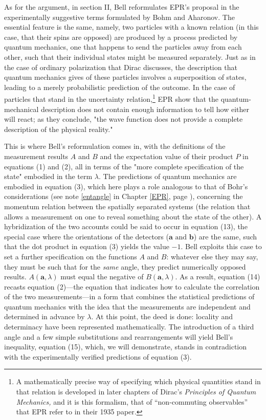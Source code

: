As for the argument, in section II, Bell reformulates EPR's proposal in the experimentally suggestive terms formulated by Bohm and Aharonov. The essential feature is the same, namely, two
particles with a known relation (in this case, that their spins are opposed) are produced 
by a process predicted by quantum mechanics, one that happens to send the particles away from 
each other, such that their individual states might be measured separately. Just as in the case
of ordinary polarization that Dirac discusses, the description that quantum mechanics gives of these particles involves a superposition of states, leading to a merely probabilistic prediction of the outcome. In the case of particles that stand in the uncertainty relation,\footnote{A mathematically precise way of specifying which physical quantities stand in that relation is developed in later chapters of Dirac's \emph{Principles of Quantum Mechanics,} and it is this formalism, that of ``non-commuting observables'' that EPR refer to in their 1935 paper.} EPR show that the quantum-mechanical description does not contain enough information to tell how either will react; as they conclude, "the wave function does not provide a complete description of the physical reality."

This is where Bell's reformulation comes in, with the definitions of the measurement results $A$ and
$B$ and the expectation value of their product $P$ in equations (1) and (2), all in terms of the "more complete specification of the state" embodied in the term $\lambda$. The predictions of quantum
mechanics are embodied in equation (3), which here plays a role analogous to that of Bohr's 
considerations (see note \ref{entangle} in Chapter \ref{EPR}, page \pageref{entangle}), concerning the momentum relation between the spatially 
separated systems (the relation that allows a measurement on one to reveal something about the state
of the other). A hybridization of the two accounts could be said to occur in equation (13), 
the special case where the orientations of the detectors ($\pmb{a} \text{ and } \pmb{b}$) are the same,
such that the dot product in equation (3) yields the value $-1$. Bell exploits this case to set a
further specification on the functions $A$ and $B$: whatever else they may say, they must
be such that for the \emph{same} angle, they predict numerically opposed results. $A(\pmb{a},\lambda)$
must equal the negative of $B(\pmb{a},\lambda)$. As a result, equation (14) recasts equation (2)---the equation that indicates how to calculate the correlation of the two measurements---in a form that combines the statistical predictions of quantum mechanics with the idea that the measurements are independent and determined in
advance by $\lambda$. At this point, the deed is done: locality and determinacy have been represented mathematically. The introduction of a third angle and a few simple substitutions and rearrangements will yield Bell's inequality, equation (15), which, we will demonstrate, stands in contradiction with the experimentally verified predictions of equation (3).

